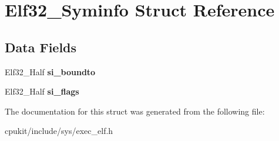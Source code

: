 \hypertarget{structElf32__Syminfo}{}\section{Elf32\+\_\+\+Syminfo Struct Reference}
\label{structElf32__Syminfo}
\subsection*{Data Fields}
\begin{DoxyCompactItemize}
\item 
\mbox{\label{structElf32__Syminfo_a9d321c4cc96a0324a9b2dbe98bca2bd9}} 
Elf32\+\_\+\+Half {\bfseries si\+\_\+boundto}
\item 
\mbox{\label{structElf32__Syminfo_a3c3931c5ff4c0681e1511987ea83649e}} 
Elf32\+\_\+\+Half {\bfseries si\+\_\+flags}
\end{DoxyCompactItemize}


The documentation for this struct was generated from the following file\+:\begin{DoxyCompactItemize}
\item 
cpukit/include/sys/exec\+\_\+elf.\+h\end{DoxyCompactItemize}
